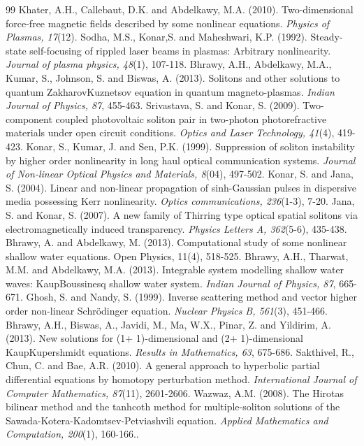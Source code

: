 \documentclass{article}
\numberwithin{equation}{section}
\begin{document}
\begin{thebibliography}{99}
Khater, A.H., Callebaut, D.K. and Abdelkawy, M.A. (2010). Two-dimensional force-free magnetic fields described by some nonlinear equations. \emph{Physics of Plasmas, 17}(12).
 Sodha, M.S., Konar,S. and Maheshwari, K.P. (1992). Steady-state self-focusing of rippled laser beams in plasmas: Arbitrary nonlinearity. \emph{Journal of plasma physics, 48}(1), 107-118.
 Bhrawy, A.H., Abdelkawy, M.A., Kumar, S., Johnson, S. and Biswas, A. (2013). Solitons and other solutions to quantum ZakharovKuznetsov equation in quantum magneto-plasmas. \emph{Indian Journal of Physics, 87}, 455-463.
Srivastava, S. and Konar, S. (2009). Two-component coupled photovoltaic soliton pair in two-photon photorefractive materials under open circuit conditions. \emph{Optics and Laser Technology, 41}(4), 419-423.
Konar, S., Kumar, J. and Sen, P.K. (1999). Suppression of soliton instability by higher order nonlinearity in long haul optical communication systems. \emph{Journal of Non-linear Optical Physics and Materials, 8}(04), 497-502.
Konar, S. and Jana, S. (2004). Linear and non-linear propagation of sinh-Gaussian pulses in dispersive media possessing Kerr nonlinearity. \emph{Optics communications, 236}(1-3), 7-20.
Jana, S. and Konar, S. (2007). A new family of Thirring type optical spatial solitons via electromagnetically induced transparency. \emph{Physics Letters A, 362}(5-6), 435-438.
Bhrawy, A. and Abdelkawy, M. (2013). Computational study of some nonlinear shallow water equations. Open Physics, 11(4), 518-525.
Bhrawy, A.H., Tharwat, M.M. and Abdelkawy, M.A. (2013). Integrable system modelling shallow water waves: KaupBoussinesq shallow water system. \emph{Indian Journal of Physics, 87}, 665-671.
Ghosh, S. and Nandy, S. (1999). Inverse scattering method and vector higher order non-linear Schrödinger equation. \emph{Nuclear Physics B, 561}(3), 451-466.
Bhrawy, A.H., Biswas, A., Javidi, M., Ma, W.X., Pinar, Z. and Yildirim, A. (2013). New solutions for (1+ 1)-dimensional and (2+ 1)-dimensional KaupKupershmidt equations. \emph{Results in Mathematics, 63}, 675-686.
Sakthivel, R., Chun, C. and Bae, A.R. (2010). A general approach to hyperbolic partial differential equations by homotopy perturbation method. \emph{International Journal of Computer Mathematics, 87}(11), 2601-2606.
Wazwaz, A.M. (2008). The Hirotas bilinear method and the tanhcoth method for multiple-soliton solutions of the Sawada-Kotera-Kadomtsev-Petviashvili equation. \emph{Applied Mathematics and Computation, 200}(1), 160-166..

\end{thebibliography}
\end{document}
